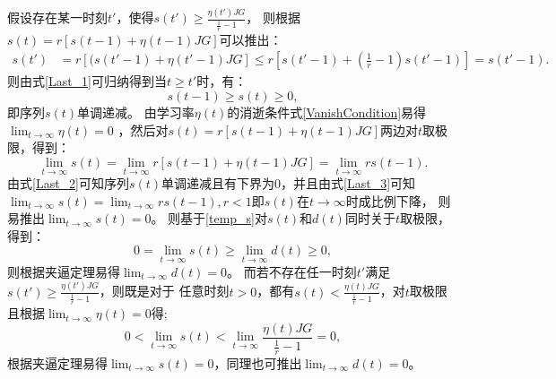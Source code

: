 假设存在某一时刻$t'$，使得$s\left(t'\right)\geqslant\frac{\eta\left(t'\right)JG}{\frac{1}{r}-1}$，
则根据$s\left(t\right)=r\left[s\left(t-1\right)+\eta\left(t-1\right)JG\right]$可以推出：
\begin{equation}
    \label{Last_1}
    \begin{split}
        s\left(t'\right) &= r\left[(s\left(t'-1\right)+\eta\left(t'-1\right)JG\right] 
        \leq r\left[
            s\left(t'-1\right) + \left(\frac{1}{r}-1\right)s\left(t'-1\right)
        \right]=s\left(t'-1\right).
    \end{split}
\end{equation}
则由式\eqref{Last_1}可归纳得到当$t\geqslant t'$时，有：
\begin{equation}
    \label{Last_2}
    s\left(t-1\right) \geqslant s\left(t\right) \geqslant 0,
\end{equation}
即序列$s\left(t\right)$单调递减。
由学习率$\eta\left(t\right)$的消逝条件式\eqref{VanishCondition}易得$\lim_{t\to\infty}\eta\left(t\right)=0$
，然后对$s\left(t\right)=r\left[s\left(t-1\right)+\eta\left(t-1\right)JG\right]$两边对$t$取极限，得到：
\begin{equation}
    \label{Last_3}
    \lim_{t\to\infty}s\left(t\right)=\lim_{t\to\infty}r\left[s\left(t-1\right)+\eta\left(t-1\right)JG\right]
    =\lim_{t\to\infty}rs\left(t-1\right).
\end{equation}
由式\eqref{Last_2}可知序列$s\left(t\right)$单调递减且有下界为0，并且由式\eqref{Last_3}可知
$\lim_{t\to\infty}s\left(t\right)=\lim_{t\to\infty}rs\left(t-1\right),r<1$即$s\left(t\right)$在$t\to\infty$时成比例下降，
则易推出$\lim_{t\to\infty}s\left(t\right)=0$。
则基于\eqref{temp_s}对$s\left(t\right)$和$d\left(t\right)$同时关于$t$取极限，得到：
\begin{equation}
    \label{Last_4}
    0=\lim_{t\to\infty}s\left(t\right) \geqslant \lim_{t\to\infty}d\left(t\right) \geqslant 0,
\end{equation}
则根据夹逼定理易得$\lim_{t\to\infty}d\left(t\right)=0$。
而若不存在任一时刻$t'$满足$s\left(t'\right)\geqslant\frac{\eta\left(t'\right)JG}{\frac{1}{r}-1}$，则既是对于
任意时刻$t>0$，都有$s\left(t\right)<\frac{\eta\left(t\right)JG}{\frac{1}{r}-1}$，对$t$取极限且根据$\lim_{t\to\infty}\eta\left(t\right)=0$得;
\begin{equation}
    \label{Last_5}
    0<\lim_{t\to\infty}s\left(t\right)<\lim_{t\to\infty}\frac{\eta\left(t\right)JG}{\frac{1}{r}-1}=0,
\end{equation}
根据夹逼定理易得$\lim_{t\to\infty}s\left(t\right)=0$，同理也可推出$\lim_{t\to\infty}d\left(t\right)=0$。

